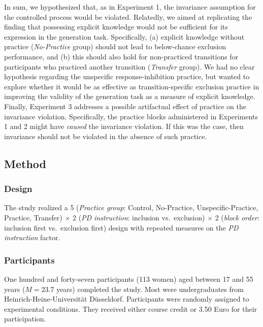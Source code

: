 \documentclass[floatsintext,man]{apa6}
\begin{document}
In sum, we hypothesized that, as in Experiment 1, the invariance
assumption for the controlled process would be violated. Relatedly, we
aimed at replicating the finding that possessing explicit knowledge
would not be sufficient for its expression in the generation task.
Specifically, (a) explicit knowledge without practice
(\emph{No-Practice} group) should not lead to below-chance exclusion
performance, and (b) this should also hold for non-practiced transitions
for participants who practiced another transition (\emph{Transfer}
group). We had no clear hypothesis regarding the unspecific
response-inhibition practice, but wanted to explore whether it would be
as effective as transition-specific exclusion practice in improving the
validity of the generation task as a measure of explicit knowledge.
Finally, Experiment 3 addresses a possible artifactual effect of
practice on the invariance violation. Specifically, the practice blocks
administered in Experiments 1 and 2 might have \emph{caused} the
invariance violation. If this was the case, then invariance should not
be violated in the absence of such practice.

\subsection{Method}\label{method-2}

\subsubsection{Design}\label{design-2}

The study realized a 5 (\emph{Practice group}: Control, No-Practice,
Unspecific-Practice, Practice, Transfer) \(\times\) 2 (\emph{PD
instruction}: inclusion vs.~exclusion) \(\times\) 2 (\emph{block order}:
inclusion first vs.~exclusion first) design with repeated measures on
the \emph{PD instruction} factor.

\subsubsection{Participants}\label{participants-2}

One hundred and forty-seven participants (113 women) aged between 17 and
55 years (\(M = 23.7\) years) completed the study. Most were
undergraduates from Heinrich-Heine-Universität Düsseldorf. Participants
were randomly assigned to experimental conditions. They received either
course credit or 3.50 Euro for their participation.
\end{document}
